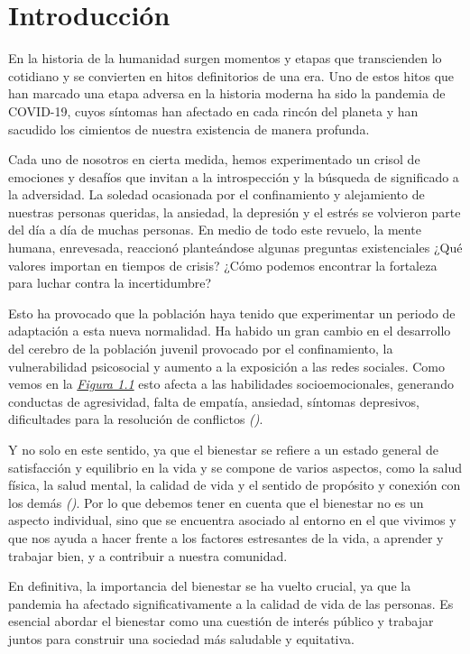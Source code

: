 \chapter{Introducción}

En la historia de la humanidad surgen momentos y etapas que transcienden lo cotidiano y se convierten en hitos definitorios de una era. Uno de estos hitos que han marcado una etapa adversa en la historia moderna ha sido la pandemia de COVID-19, cuyos síntomas han afectado en cada rincón del planeta y han sacudido los cimientos de nuestra existencia de manera profunda. 

Cada uno de nosotros en cierta medida, hemos experimentado un crisol de emociones y desafíos que invitan a la introspección y la búsqueda de significado a la adversidad. La soledad ocasionada por el confinamiento y alejamiento de nuestras personas queridas, la ansiedad, la depresión y el estrés se volvieron parte del día a día de muchas personas. En medio de todo este revuelo, la mente humana, enrevesada, reaccionó planteándose algunas preguntas existenciales ¿Qué valores importan en tiempos de crisis? ¿Cómo podemos encontrar la fortaleza para luchar contra la incertidumbre? 

Esto ha provocado que la población haya tenido que experimentar un periodo de adaptación a esta nueva normalidad. Ha habido un gran cambio en el desarrollo del cerebro de la población juvenil provocado por el confinamiento, la vulnerabilidad psicosocial y aumento a la exposición a las redes sociales. Como vemos en la \textit{\hyperref[fig:impacto]{Figura 1.1}} esto afecta a las habilidades socioemocionales, generando conductas de agresividad, falta de empatía, ansiedad, síntomas depresivos, dificultades para la resolución de conflictos \textit{(\cite{psychiatry2020})}. 

Y no solo en este sentido, ya que el bienestar se refiere a un estado general de satisfacción y equilibrio en la vida y se compone de varios aspectos, como la salud física, la salud mental, la calidad de vida y el sentido de propósito y conexión con los demás \textit{(\cite{bienestar})}. Por lo que debemos tener en cuenta que el bienestar no es un aspecto individual, sino que se encuentra asociado al entorno en el que vivimos y que nos ayuda a hacer frente a los factores estresantes de la vida, a aprender y trabajar bien, y a contribuir a nuestra comunidad.

En definitiva, la importancia del bienestar se ha vuelto crucial, ya que la pandemia ha afectado significativamente a la calidad de vida de las personas. Es esencial abordar el bienestar como una cuestión de interés público y trabajar juntos para construir una sociedad más saludable y equitativa. 

